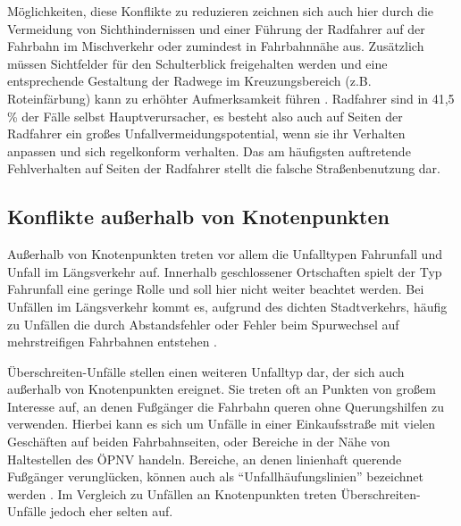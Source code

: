 Möglichkeiten, diese Konflikte zu reduzieren zeichnen sich auch hier durch die Vermeidung von Sichthindernissen und einer Führung der Radfahrer auf der Fahrbahn im Mischverkehr oder zumindest in Fahrbahnnähe aus. Zusätzlich müssen Sichtfelder für den Schulterblick freigehalten werden und eine entsprechende Gestaltung der Radwege im Kreuzungsbereich (z.B. Roteinfärbung) kann zu erhöhter Aufmerksamkeit führen \parencite[S. 309]{Schreiber.2014b}. Radfahrer sind in 41,5 \% \parencite[S. 10]{Below.2016} der Fälle selbst Hauptverursacher, es besteht also auch auf Seiten der Radfahrer ein großes Unfallvermeidungspotential, wenn sie ihr Verhalten anpassen und sich regelkonform verhalten. Das am häufigsten auftretende Fehlverhalten auf Seiten der Radfahrer stellt die falsche Straßenbenutzung dar.

\subsection{Konflikte außerhalb von Knotenpunkten}
Außerhalb von Knotenpunkten treten vor allem die Unfalltypen Fahrunfall und Unfall im Längsverkehr auf. Innerhalb geschlossener Ortschaften spielt der Typ Fahrunfall eine geringe Rolle und soll hier nicht weiter beachtet werden. Bei Unfällen im Längsverkehr kommt es, aufgrund des dichten Stadtverkehrs, häufig zu Unfällen die durch Abstandsfehler oder Fehler beim Spurwechsel auf mehrstreifigen Fahrbahnen entstehen \parencite[S. 25]{Schmidt.2010}.

Überschreiten-Unfälle stellen einen weiteren Unfalltyp dar, der sich auch außerhalb von Knotenpunkten ereignet. Sie treten oft an Punkten von großem Interesse auf, an denen Fußgänger die Fahrbahn queren ohne Querungshilfen zu verwenden. Hierbei kann es sich um Unfälle in einer Einkaufsstraße mit vielen Geschäften auf beiden Fahrbahnseiten, oder Bereiche in der Nähe von Haltestellen des \ac{ÖPNV} handeln. %
Bereiche, an denen linienhaft querende Fußgänger verunglücken, können auch als \enquote{Unfallhäufungslinien} bezeichnet werden \parencite[S. 18]{ForschungsgesellschaftfurStraenundVerkehrswesen.2012}. Im Vergleich zu Unfällen an Knotenpunkten treten Überschreiten-Unfälle jedoch eher selten auf.

